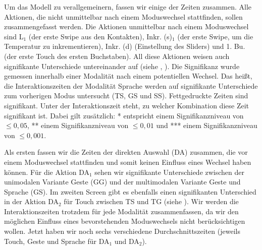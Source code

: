 Um das Modell zu verallgemeinern, fassen wir einige der Zeiten zusammen.
Alle Aktionen, die nicht unmittelbar nach einem Moduswechsel stattfinden, sollen zusammengefasst werden.
Die Aktionen unmittelbar nach einem Moduswechsel sind L$_1$ (der erste Swipe aus den Kontakten), Inkr. (s)$_1$ (der erste Swipe, um die Temperatur zu inkrementieren), Inkr. (d) (Einstellung des Sliders) und 1. Bu. (der erste Touch des ersten Buchstaben).
All diese Aktionen weisen auch signifikante Unterschiede untereinander auf (siehe , ).
Die Signifikanz wurde gemessen innerhalb einer Modalität nach einem potentiellen Wechsel.
Das heißt, die Interaktionszeiten der Modalität Sprache werden auf signifikante Unterschiede zum vorherigen Modus untersucht (TS, GS und SS).
Fettgedruckte Zeiten sind signifikant.
Unter der Interaktionszeit steht, zu welcher Kombination diese Zeit signifikant ist.
Dabei gilt zusätzlich: * entspricht einem Signifikanzniveau von $\leq 0,05$, ** einem Signifikanzniveau von $\leq 0,01$ und *** einem Signifikanzniveau von $\leq 0,001$.

Als ersten fassen wir die Zeiten der direkten Auswahl (DA) zusammen, die vor einem Moduswechsel stattfinden und somit keinen Einfluss eines Wechsel haben können.
Für die Aktion DA$_1$ sehen wir signifikante Unterschiede zwischen der unimodalen Variante Geste (GG) und der multimodalen Variante Geste und Sprache (GS).
Im zweiten Screen gibt es ebenfalls einen signifikanten Unterschied in der Aktion DA$_2$ für Touch zwischen TS und TG (siehe ).
Wir werden die Interaktionszeiten trotzdem für jede Modalität zusammenfassen, da wir den möglichen Einfluss eines bevorstehenden Moduswechsels nicht berücksichtigen wollen.
Jetzt haben wir noch sechs verschiedene Durchschnittszeiten (jeweils Touch, Geste und Sprache für DA$_1$ und DA$_2$).


